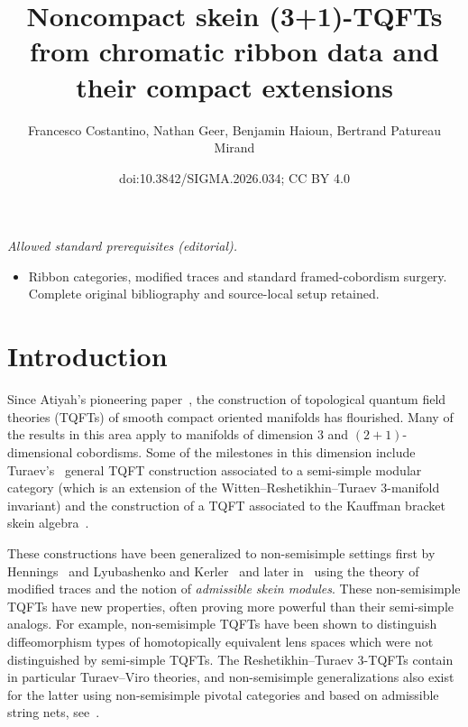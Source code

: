 \documentclass[10pt,a4paper]{amsart}
\title{Noncompact skein (3+1)-TQFTs from chromatic ribbon data and their compact extensions}
\author{Francesco Costantino, Nathan Geer, Benjamin Haioun, Bertrand Patureau Mirand}
\date{doi:10.3842/SIGMA.2026.034; CC BY 4.0}
\numberwithin{equation}{section}
\numberwithin{theorem}{section}
\numberwithin{proposition}{section}
\numberwithin{definition}{section}
\numberwithin{lemma}{section}
\numberwithin{corollary}{section}
\numberwithin{remark}{section}
\numberwithin{example}{section}
\begin{document}
\maketitle
\noindent\textit{Allowed standard prerequisites (editorial).}\begin{itemize}
\item Ribbon categories, modified traces and standard framed-cobordism surgery. Complete original bibliography and source-local setup retained.
\end{itemize}\medskip
\section{Introduction}

Since Atiyah's pioneering paper~\cite{At}, the construction of topological quantum field theories (TQFTs) of smooth compact oriented manifolds has flourished. Many of the results in this area apply to
manifolds of dimension $3$ and $(2+1)$-dimensional cobordisms.
Some of the milestones in this dimension include Turaev's~\cite{Tu} general TQFT construction associated to a semi-simple modular category (which is an extension of the Witten--Reshetikhin--Turaev 3-manifold invariant) and the construction of a TQFT associated to the Kauffman bracket skein algebra~\cite{BHMV95}.

These constructions have been generalized to non-semisimple settings first by Hennings~\cite{H96} and Lyubashenko and Kerler~\cite{KerLy2001, L94} and later in~\cite{BCGP14,CGPV2023a,DRGGPMR2022} using the theory of modified traces and the notion of \emph{admissible skein modules}. These non-semisimple TQFTs have new properties, often proving more powerful than their semi-simple analogs. For example, non-semisimple TQFTs have
been
shown to distinguish diffeomorphism types of homotopically equivalent lens spaces which were not distinguished by semi-simple TQFTs.
The Reshetikhin--Turaev 3-TQFTs contain in particular Turaev--Viro theories, and non-semisimple
generalizations
also exist for the latter using non-semisimple pivotal categories and based on admissible string nets, see~\mbox{\cite{CGPV2023a, MSWY23}}.
\end{document}

